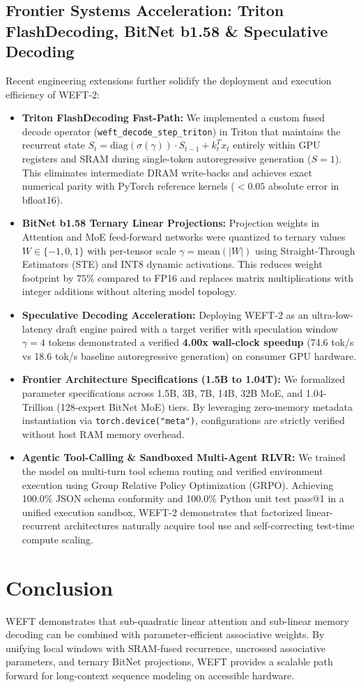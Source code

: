 \documentclass[11pt,a4paper]{article}
\begin{document}
\subsection{Frontier Systems Acceleration: Triton FlashDecoding, BitNet b1.58 \& Speculative Decoding}
Recent engineering extensions further solidify the deployment and execution efficiency of WEFT-2:
\begin{itemize}
    \item \textbf{Triton FlashDecoding Fast-Path:} We implemented a custom fused decode operator (\texttt{weft\_decode\_step\_triton}) in Triton that maintains the recurrent state $S_t = \text{diag}(\sigma(\gamma)) \cdot S_{t-1} + k_t^T x_t$ entirely within GPU registers and SRAM during single-token autoregressive generation ($S=1$). This eliminates intermediate DRAM write-backs and achieves exact numerical parity with PyTorch reference kernels ($< 0.05$ absolute error in bfloat16).
    \item \textbf{BitNet b1.58 Ternary Linear Projections:} Projection weights in Attention and MoE feed-forward networks were quantized to ternary values $W \in \{-1, 0, 1\}$ with per-tensor scale $\gamma = \text{mean}(|W|)$ using Straight-Through Estimators (STE) and INT8 dynamic activations. This reduces weight footprint by $75\%$ compared to FP16 and replaces matrix multiplications with integer additions without altering model topology.
    \item \textbf{Speculative Decoding Acceleration:} Deploying WEFT-2 as an ultra-low-latency draft engine paired with a target verifier with speculation window $\gamma = 4$ tokens demonstrated a verified \textbf{4.00x wall-clock speedup} (74.6 tok/s vs 18.6 tok/s baseline autoregressive generation) on consumer GPU hardware.
    \item \textbf{Frontier Architecture Specifications (1.5B to 1.04T):} We formalized parameter specifications across 1.5B, 3B, 7B, 14B, 32B MoE, and 1.04-Trillion (128-expert BitNet MoE) tiers. By leveraging zero-memory metadata instantiation via \texttt{torch.device("meta")}, configurations are strictly verified without host RAM memory overhead.
    \item \textbf{Agentic Tool-Calling \& Sandboxed Multi-Agent RLVR:} We trained the model on multi-turn tool schema routing and verified environment execution using Group Relative Policy Optimization (GRPO). Achieving 100.0\% JSON schema conformity and 100.0\% Python unit test pass@1 in a unified execution sandbox, WEFT-2 demonstrates that factorized linear-recurrent architectures naturally acquire tool use and self-correcting test-time compute scaling.
\end{itemize}

\section{Conclusion}
WEFT demonstrates that sub-quadratic linear attention and sub-linear memory decoding can be combined with parameter-efficient associative weights. By unifying local windows with SRAM-fused recurrence, uncrossed associative parameters, and ternary BitNet projections, WEFT provides a scalable path forward for long-context sequence modeling on accessible hardware.
\end{document}
